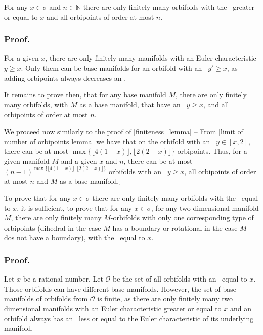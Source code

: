 
\begin{observation}\label{first_finiteness_theorem}
For any $x \in \sigma$ and $n \in \mathbb{N}$ there are only finitely many orbifolds 
with the \Eoc\ greater or equal to $x$ and all orbipoints of order at most $n$.
\end{observation}
\subsubsection{Proof.} 

For a given $x$, there are only finitely many manifolds 
with an Euler characteristic $y \geq x$. Only them can be 
base manifolds for an orbifold with an \Eoc\ $y'\geq x$, as adding orbipoints always 
decreases an \Eoc. 

It remains to prove then, that for any base manifold $M$, there are only finitely many orbifolds, 
with $M$ as a base manifold, that have 
 an \Eoc\ $y \geq x$, and all orbipoints of order at most $n$.

We proceed now similarly to the proof of \ref{finiteness_lemma} -- 
From \ref{limit of number of orbipoints lemma} we have that 
on the orbifold with an \Eoc\ $y \in [x,2]$, there can be at most 
$\max \{\lfloor 4(1-x) \rfloor, \lfloor 2(2-x) \rfloor\}$ orbipoints. 
Thus, for a given manifold $M$ and a given $x$ and $n$, there can be at most 
$(n-1)^{\max \{\lfloor 4(1-x) \rfloor, \lfloor 2(2-x) \rfloor\}}$ orbifolds with an \Eoc\ 
$y \geq x$, 
all orbipoints of order at most $n$ and $M$ as a base manifold.$_\square$ 

\begin{observation}\label{simplification of the finiteness theorem}
To prove that for any $x \in \sigma$ there are only finitely many orbifolds 
with the \Eoc\ equal to $x$, it is sufficient, to prove that 
for any $x \in \sigma$, for any two dimensional manifold $M$, there are only 
finitely many $M$-orbifolds with only one corresponding type of orbipoints (dihedral in the case 
$M$ has a boundary or rotational in the case $M$ dos not have a boundary), 
with the \Eoc\ equal to $x$.
\end{observation}
\subsubsection{Proof.}
Let $x$ be a rational number. 
Let $\mathcal{O}$ be the set of all orbifolds with 
an \Eoc\ equal to $x$. 
Those orbifolds can have different base manifolds. However, the set of base manifolds of 
orbifolds from $\mathcal{O}$ is finite, as there are only finitely many 
two dimensional manifolds with an Euler characteristic greater or equal to $x$ and an 
orbifold always has 
an \Eoc\ less or equal to the Euler characteristic of its underlying manifold. 

